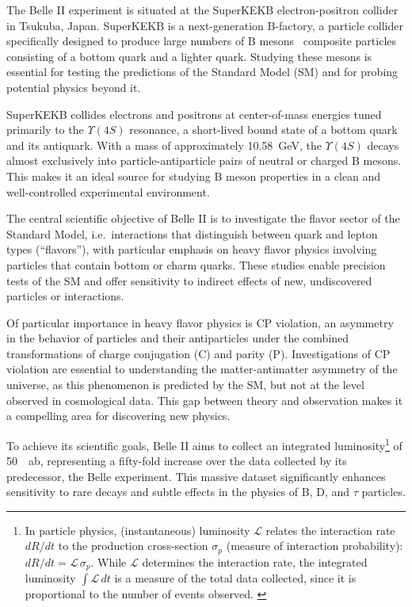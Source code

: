 The Belle II experiment is situated at the SuperKEKB electron-positron collider in Tsukuba, Japan. 
SuperKEKB is a next-generation B-factory, a particle collider specifically designed to produce large numbers of B mesons \textemdash\ composite particles consisting of a bottom quark and a lighter quark. 
Studying these mesons is essential for testing the predictions of the Standard Model (SM) and for probing potential physics beyond it.

SuperKEKB collides electrons and positrons at center-of-mass energies tuned primarily to the $\Upsilon(4S)$ resonance, a short-lived bound state of a bottom quark and its antiquark. 
With a mass of approximately \qty{10.58}{\giga\electronvolt}, the $\Upsilon(4S)$ decays almost exclusively into particle-antiparticle pairs of neutral or charged B mesons. 
This makes it an ideal source for studying B meson properties in a clean and well-controlled experimental environment.

The central scientific objective of Belle II is to investigate the flavor sector of the Standard Model, i.e.\ interactions that distinguish between quark and lepton types (\enquote{flavors}), 
with particular emphasis on heavy flavor physics involving particles that contain bottom or charm quarks. 
These studies enable precision tests of the SM and offer sensitivity to indirect effects of new, undiscovered particles or interactions.

Of particular importance in heavy flavor physics is CP violation, an asymmetry in the behavior of particles and their antiparticles under the combined transformations of charge conjugation (C) and parity (P).
Investigations of CP violation are essential to understanding the matter-antimatter asymmetry of the universe, as this phenomenon is predicted by the SM, but not at the level observed in cosmological data.
This gap between theory and observation makes it a compelling area for discovering new physics.

To achieve its scientific goals, Belle II aims to collect an integrated luminosity\footnote{%
In particle physics, (instantaneous) luminosity $\mathcal{L}$ relates the interaction rate $dR/dt$ to the production cross-section $\sigma_p$ (measure of interaction probability): $dR/dt = \mathcal{L}\,\sigma_p$. 
While $\mathcal{L}$ determines the interaction rate, the integrated luminosity $\int\mathcal{L}\,dt$ is a measure of the total data collected, since it is proportional to the number of events observed. \cite{luminosity}
} of \qty{50}{\per\atto\barn}, representing a fifty-fold increase over the data collected by its predecessor, the Belle experiment. 
This massive dataset significantly enhances sensitivity to rare decays and subtle effects in the physics of B, D, and $\tau$ particles.

